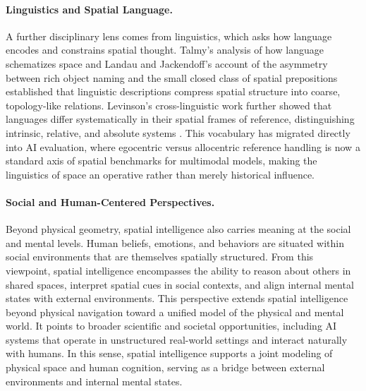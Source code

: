 \paragraph{Linguistics and Spatial Language.}
A further disciplinary lens comes from linguistics, which asks how language encodes and constrains spatial thought.
Talmy's analysis of how language schematizes space \cite{talmy1983how} and Landau and Jackendoff's account of the asymmetry between rich object naming and the small closed class of spatial prepositions \cite{landau1993whence} established that linguistic descriptions compress spatial structure into coarse, topology-like relations.
Levinson's cross-linguistic work further showed that languages differ systematically in their spatial frames of reference, distinguishing intrinsic, relative, and absolute systems \cite{levinson2003space}.
This vocabulary has migrated directly into AI evaluation, where egocentric versus allocentric reference handling is now a standard axis of spatial benchmarks for multimodal models, making the linguistics of space an operative rather than merely historical influence.




\paragraph{Social and Human-Centered Perspectives.}
Beyond physical geometry, spatial intelligence also carries meaning at the social and mental levels.
Human beliefs, emotions, and behaviors are situated within social environments that are themselves spatially structured.
From this viewpoint, spatial intelligence encompasses the ability to reason about others in shared spaces, interpret spatial cues in social contexts, and align internal mental states with external environments.
This perspective extends spatial intelligence beyond physical navigation toward a unified model of the physical and mental world.
It points to broader scientific and societal opportunities, including AI systems that operate in unstructured real-world settings and interact naturally with humans.
In this sense, spatial intelligence supports a joint modeling of physical space and human cognition, serving as a bridge between external environments and internal mental states.









